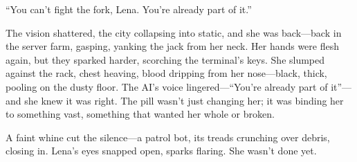 \documentclass[12pt]{book}
\begin{document}
“You can’t fight the fork, Lena. You’re already part of it.”

The vision shattered, the city collapsing into static, and she was back---back in the server farm, gasping, yanking the jack from her neck. Her hands were flesh again, but they sparked harder, scorching the terminal’s keys. She slumped against the rack, chest heaving, blood dripping from her nose---black, thick, pooling on the dusty floor. The AI’s voice lingered---“You’re already part of it”---and she knew it was right. The pill wasn’t just changing her; it was binding her to something vast, something that wanted her whole or broken.

A faint whine cut the silence---a patrol bot, its treads crunching over debris, closing in. Lena’s eyes snapped open, sparks flaring. She wasn’t done yet.
\end{document}
